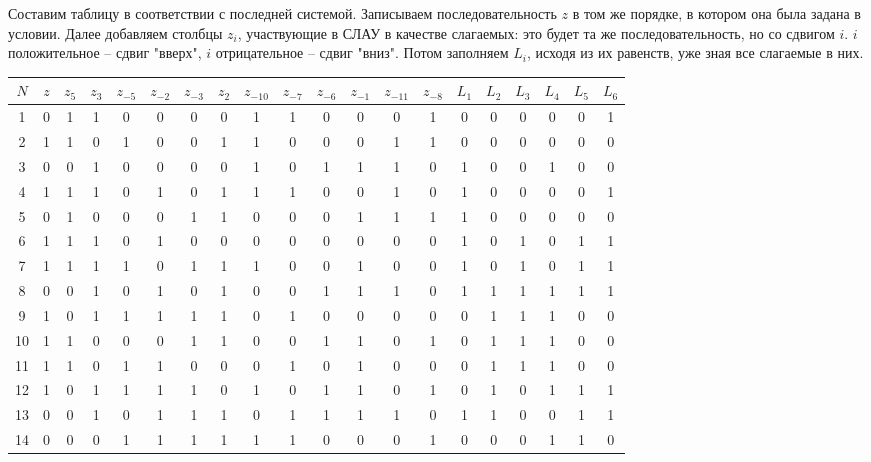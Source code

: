 \documentclass[letterpaper,11pt,openany]{book}
\begin{document}
Составим таблицу в соответствии с последней системой. Записываем последовательность $z$ в том же порядке, в котором она была задана в условии. Далее добавляем столбцы $z_i$, участвующие в СЛАУ в качестве слагаемых: это будет та же последовательность, но со сдвигом $i$. $i$ положительное -- сдвиг "вверх", $i$ отрицательное -- сдвиг "вниз". Потом заполняем $L_i$, исходя из их равенств, уже зная все слагаемые в них.

\medskip

\begin{adjustbox}{center}
\begin{tabular}{||c|c|c|c|c|c|c|c|c|c|c|c|c|c|c|c|c|c|c|c||}
\hline
$N$ & $z$ & $z_5$ & $z_3$ & $z_{-5}$ & $z_{-2}$ & $z_{-3}$ & $z_{2}$ & $z_{-10}$ & $z_{-7}$ & $z_{-6}$ & $z_{-1}$ & $z_{-11}$ & $z_{-8}$ & $L_1$ & $L_2$ & $L_3$ & $L_4$ & $L_5$ & $L_6$\\
\hline
1 & 0 & 1 & 1 & 0 & 0 & 0 & 0 & 1 & 1 & 0 & 0 & 0 & 1 & 0 & 0 & 0 & 0 & 0 & 1 \\
\hline
2 & 1 & 1 & 0 & 1 & 0 & 0 & 1 & 1 & 0 & 0 & 0 & 1 & 1 & 0 & 0 & 0 & 0 & 0 & 0 \\
\hline
3 & 0 & 0 & 1 & 0 & 0 & 0 & 0 & 1 & 0 & 1 & 1 & 1 & 0 & 1 & 0 & 0 & 1 & 0 & 0 \\
\hline
4 & 1 & 1 & 1 & 0 & 1 & 0 & 1 & 1 & 1 & 0 & 0 & 1 & 0 & 1 & 0 & 0 & 0 & 0 & 1 \\
\hline
5 & 0 & 1 & 0 & 0 & 0 & 1 & 1 & 0 & 0 & 0 & 1 & 1 & 1 & 1 & 0 & 0 & 0 & 0 & 0 \\
\hline
6 & 1 & 1 & 1 & 0 & 1 & 0 & 0 & 0 & 0 & 0 & 0 & 0 & 0 & 1 & 0 & 1 & 0 & 1 & 1 \\
\hline
7 & 1 & 1 & 1 & 1 & 0 & 1 & 1 & 1 & 0 & 0 & 1 & 0 & 0 & 1 & 0 & 1 & 0 & 1 & 1 \\
\hline
8 & 0 & 0 & 1 & 0 & 1 & 0 & 1 & 0 & 0 & 1 & 1 & 1 & 0 & 1 & 1 & 1 & 1 & 1 & 1 \\
\hline
9 & 1 & 0 & 1 & 1 & 1 & 1 & 1 & 0 & 1 & 0 & 0 & 0 & 0 & 0 & 1 & 1 & 1 & 0 & 0 \\
\hline
10 & 1 & 1 & 0 & 0 & 0 & 1 & 1 & 0 & 0 & 1 & 1 & 0 & 1 & 0 & 1 & 1 & 1 & 0 & 0 \\
\hline
11 & 1 & 1 & 0 & 1 & 1 & 0 & 0 & 0 & 1 & 0 & 1 & 0 & 0 & 0 & 1 & 1 & 1 & 0 & 0 \\
\hline
12 & 1 & 0 & 1 & 1 & 1 & 1 & 0 & 1 & 0 & 1 & 1 & 0 & 1 & 0 & 1 & 0 & 1 & 1 & 1 \\
\hline
13 & 0 & 0 & 1 & 0 & 1 & 1 & 1 & 0 & 1 & 1 & 1 & 1 & 0 & 1 & 1 & 0 & 0 & 1 & 1 \\
\hline
14 & 0 & 0 & 0 & 1 & 1 & 1 & 1 & 1 & 1 & 0 & 0 & 0 & 1 & 0 & 0 & 0 & 1 & 1 & 0 \\

\end{tabular}
\end{adjustbox}
\end{document}
